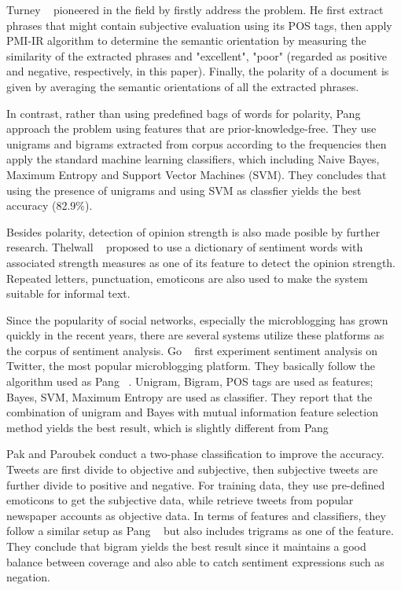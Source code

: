 \documentclass[12pt]{article}
\begin{document}
Turney \etal~\cite{Turney:02} pioneered in the field by firstly address the problem. He first extract phrases that might contain subjective evaluation using its POS tags, then apply PMI-IR algorithm \cite{Turney:01} to determine the semantic orientation by measuring the similarity of the extracted phrases and "excellent", "poor" (regarded as positive and negative, respectively, in this paper). Finally, the polarity of a document is given by averaging the semantic orientations of all the extracted phrases.

In contrast, rather than using predefined bags of words for polarity, Pang \etal~\cite{Pang:02} approach the problem using features that are prior-knowledge-free. They use unigrams and bigrams extracted from corpus according to the frequencies then apply the standard machine learning classifiers, which including Naive Bayes, Maximum Entropy and Support Vector Machines (SVM). They concludes that using the presence of unigrams and using SVM as classfier yields the best accuracy (82.9\%).

Besides polarity, detection of opinion strength is also made posible by further research. Thelwall \etal~\cite{Thelwall:10} proposed to use a dictionary of sentiment words with associated strength measures as one of its feature to detect the opinion strength. Repeated letters, punctuation, emoticons are also used to make the system suitable for informal text.

Since the popularity of social networks, especially the microblogging has grown quickly in the recent years, there are several systems utilize these platforms as the corpus of sentiment analysis. Go \etal~\cite{Go:09} first experiment sentiment analysis on Twitter, the most popular microblogging platform. They basically follow the algorithm used as Pang \etal~\cite{Pang:02}. Unigram, Bigram, POS tags are used as features; Bayes, SVM, Maximum Entropy are used as classifier. They report that the combination of unigram and Bayes with mutual information feature selection method yields the best result, which is slightly different from Pang \etal~\cite{Pang:02}

Pak and Paroubek \cite{Pak:10} conduct a two-phase classification to improve the accuracy. Tweets are first divide to objective and subjective, then subjective tweets are further divide to positive and negative. For training data, they use pre-defined emoticons to get the subjective data, while retrieve tweets from popular newspaper accounts as objective data. In terms of features and classifiers, they follow a similar setup as Pang \etal~\cite{Pang:02} but also includes trigrams as one of the feature. They conclude that bigram yields the best result since it maintains a good balance between coverage and also able to catch sentiment expressions such as negation.
\end{document}
